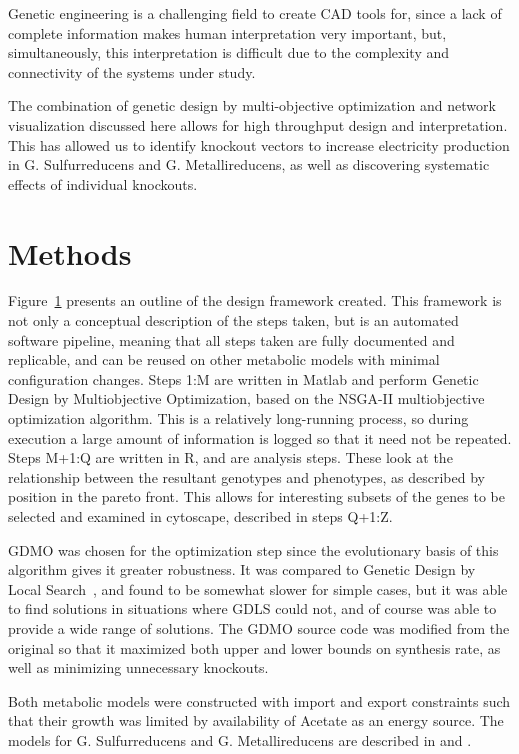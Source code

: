 \documentclass[a4paper,twocolumn]{article}
\begin{document}
Genetic engineering is a challenging field to create CAD tools for, since a lack of complete information makes human interpretation very important, but, simultaneously, this interpretation is difficult due to the complexity and connectivity of the systems under study. 


The combination of genetic design by multi-objective optimization and network visualization discussed here allows for high throughput design and interpretation. This has allowed us to identify knockout vectors to increase electricity production in G. Sulfurreducens and G. Metallireducens, as well as discovering systematic effects of individual knockouts.

\section{Methods}

Figure~\ref{fig:flowdiagram} presents an outline of the design framework created. This framework is not only a conceptual description of the steps taken, but is an automated software pipeline, meaning that all steps taken are fully documented and replicable, and can be reused on other metabolic models with minimal configuration changes. Steps 1:M are written in Matlab and perform Genetic Design by Multiobjective Optimization, based on the NSGA-II multiobjective optimization algorithm. This is a relatively long-running process, so during execution a large amount of information is logged so that it need not be repeated.  Steps M+1:Q are written in R, and are analysis steps. These look at the relationship between the resultant genotypes and phenotypes, as described by position in the pareto front. This allows for interesting subsets of the genes to be selected and examined in cytoscape, described in steps Q+1:Z.

\begin{figure}
\label{fig:flowdiagram}
\end{figure}

GDMO was chosen for the optimization step since the evolutionary basis of this algorithm gives it greater robustness. It was compared to Genetic Design by Local Search~\cite{}, and found to be somewhat slower for simple cases, but it was able to find solutions in situations where GDLS could not, and of course was able to provide a wide range of solutions. The GDMO source code was modified from the original so that it maximized both upper and lower bounds on synthesis rate, as well as minimizing unnecessary knockouts.

Both metabolic models were constructed with import and export constraints such that their growth was limited by availability of Acetate as an energy source. The models for G. Sulfurreducens and G. Metallireducens are described in \cite{} and \cite{}.
\end{document}
